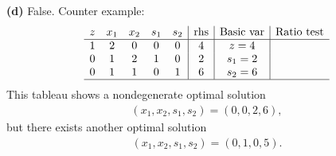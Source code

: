 \documentclass[12pt]{article}
\begin{document}
\noindent
\textbf{(d)}
False. Counter example:
\begin{equation*}
  \begin{array}{ccccc|c|c|c}
    z &  x_1      &  x_2 &  s_1 &  s_2 &   \text{rhs} & \text{Basic var} & \text{Ratio test} \\ \hline
    1 &    2      &    0 &    0 &    0 &     4        &  z=4             &                   \\
    0 &    1      &    2 &    1 &    0 &     2        &  s_1 = 2         &             \\
    0 &    1      &    1 &    0 &    1 &     6        &  s_2 = 6         &         \\ \hline
  \end{array}
\end{equation*}
This tableau shows a nondegenerate optimal solution 
\begin{gather*}
    (x_1,x_2,s_1,s_2) = (0,0,2,6), 
\end{gather*}
but there exists another optimal solution
\begin{gather*}
    (x_1,x_2,s_1,s_2) = (0,1,0,5).
\end{gather*}


\end{document}
